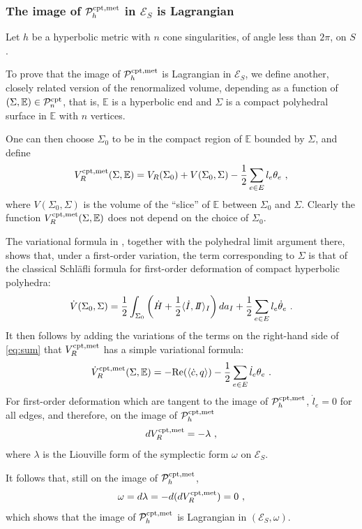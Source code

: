 \documentclass[notitlepage,twoside,a4paper]{amsart}
\newcommand{\II}{I\hspace{-0.1cm}I}
\newcommand{\Pcomet}{\cP^{\rm cpt,met}_{h}}
\newcommand{\Pcon}{\cP^{\rm cpt}_{n}}
\newcommand{\VRcomet}{V_R^{\rm cpt,met}}
\theoremstyle{named}
\newcommand{\bE}{{\mathbb E}}
\newcommand{\cE}{{\mathcal E}}
\newcommand{\cP}{{\mathcal P}}
\newcounter{notes}%
\newcommand{\marginnote}[1]{
\refstepcounter{notes}  %
\nolinebreak
$\hspace{-5pt}{}^{\text{\tiny \rm \arabic{notes}}}$
\marginpar{\tiny \arabic{notes}) #1}
}
\begin{document}
\subsubsection{The image of $\Pcomet$ in $\cE_S$ is Lagrangian}
\label{sssc:comet}

Let $h$ be a hyperbolic metric with $n$ cone singularities, of angle less than $2\pi$, on $S$.

To prove that the image of $\Pcomet$ is Lagrangian in $\cE_S$, we define another, closely related version of the renormalized volume, depending as a function of $(\Sigma, \bE)\in \Pcon$, that is, $\bE$ is a hyperbolic end and $\Sigma$ is a compact polyhedral surface in $\bE$ with $n$ vertices.

One can then choose $\Sigma_0$ to be in the compact region of $\bE$ bounded by $\Sigma$, and define
\begin{equation}
  \label{eq:sum}
 \VRcomet(\Sigma,\bE) = V_R(\Sigma_0) + V(\Sigma_0,\Sigma) -\frac 12\sum_{e\in E}l_e\theta_e~, 
\end{equation}
where $V(\Sigma_0,\Sigma)$ is the volume of the ``slice'' of $\bE$ between $\Sigma_0$ and $\Sigma$. Clearly the function $\VRcomet(\Sigma,\bE)$ does not depend on the choice of $\Sigma_0$.

The variational formula in \cite{sem,sem-era}, together with the polyhedral limit argument there, shows that, under a first-order variation, the term corresponding to $\Sigma$ is that of the classical Schl\"afli formula for first-order deformation of compact hyperbolic polyhedra:
$$ \dot V(\Sigma_0,\Sigma) =  \frac 12 \int_{\Sigma_0}\left(\dot H +\frac 12 \langle \dot I, \II\rangle_I\right)da_I + \frac 12 \sum_{e\in E} l_e\dot \theta_e~. $$
It then follows by adding the variations of the terms on the right-hand side of \eqref{eq:sum} %
that $\VRcomet$ has a simple variational formula:
$$ \dot  \VRcomet(\Sigma,\bE) = - \mathrm{Re}(\langle \dot c,q\rangle) - \frac 12\sum_{e\in E} \dot l_e \theta_e~. $$
For first-order deformation which are tangent to the image of $\Pcomet$, $\dot l_e=0$ for all edges, and therefore, on the image of $\Pcomet$
$$ d\VRcomet = - \lambda~, $$
where $\lambda$ is the Liouville form of the symplectic form $\omega$ on $\cE_S$.

It follows that, still on the image of $\Pcomet$,
$$ \omega = d\lambda = -d(d\VRcomet) = 0~, $$
which shows that the image of $\Pcomet$ is Lagrangian in $(\cE_S,\omega)$.
\end{document}
